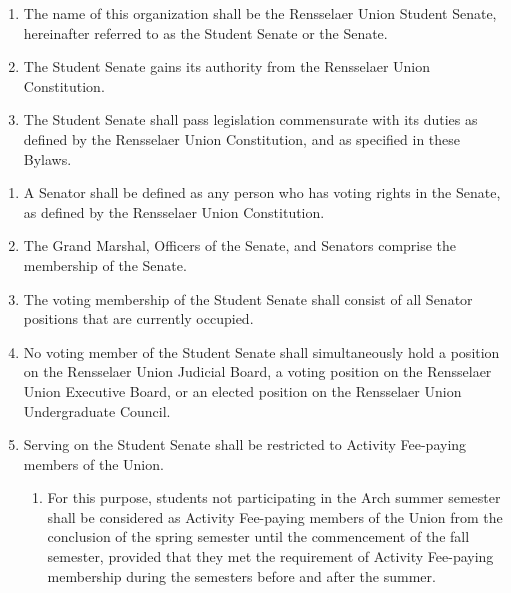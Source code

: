 

\begin{enumerate}
\item The name of this organization shall be the Rensselaer Union Student Senate, hereinafter referred to as the Student Senate or the Senate.
\item The Student Senate gains its authority from the Rensselaer Union Constitution.
\item The Student Senate shall pass legislation commensurate with its duties as defined by the Rensselaer Union Constitution, and as specified in these Bylaws.
\end{enumerate}


\begin{enumerate}
\item A Senator shall be defined as any person who has voting rights in the Senate, as defined by the Rensselaer Union Constitution.
\item The Grand Marshal, Officers of the Senate, and Senators comprise the membership of the Senate.
\item The voting membership of the Student Senate shall consist of all Senator positions that are currently occupied.
\item No voting member of the Student Senate shall simultaneously hold a position on the Rensselaer Union Judicial Board, a voting position on the Rensselaer Union Executive Board, or an elected position on the Rensselaer Union Undergraduate Council.
\item Serving on the Student Senate shall be restricted to Activity Fee-paying members of the Union.
  \begin{enumerate}
  \item For this purpose, students not participating in the Arch summer semester shall be considered as Activity Fee-paying members of the Union from the conclusion of the spring semester until the commencement of the fall semester, provided that they met the requirement of Activity Fee-paying membership during the semesters before and after the summer.
  \end{enumerate}
\end{enumerate}

